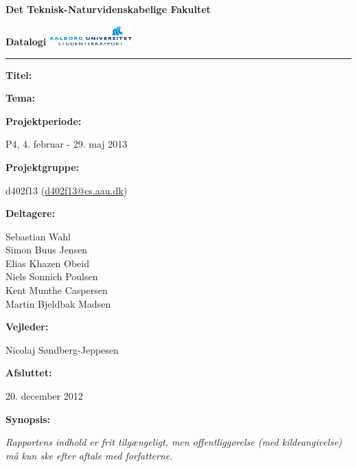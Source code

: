 \begin{nopagebreak}
\LARGE{\textbf{Det Teknisk-Naturvidenskabelige Fakultet}}\vspace{-0.9cm}

\large{\textbf{Datalogi}}
\hspace{10.5cm}\includegraphics[height=0.75cm]{billeder/aau_logo.pdf}


\hrule

\newcommand{\titleitem}[2]{\textbf{#1:}

\hspace*{0.5cm}
\begin{minipage}{0.9\columnwidth}#2\end{minipage}
\vspace{0.25cm}}
\begin{multicols}{2}

  \titleitem{Titel}{}

\titleitem{Tema}{}

\titleitem{Projektperiode}{P4, 4. februar - 29. maj 2013}

\titleitem{Projektgruppe}{d402f13 (\url{d402f13@cs.aau.dk})}

\titleitem{Deltagere}{
    Sebastian Wahl\\
    Simon Buus Jensen\\
    Elias Khazen Obeid\\
    Niels Sonnich Poulsen\\
    Kent Munthe Caspersen\\
    Martin Bjeldbak Madsen
}

\titleitem{Vejleder}{Nicolaj Søndberg-Jeppesen}

\titleitem{Afsluttet}{20. december 2012}

\vfill
\columnbreak

\titleitem{Synopsis}{  }

\end{multicols}
\centering
\textit{Rapportens indhold er frit tilgængeligt, men offentliggørelse (med kildeangivelse) må kun ske efter aftale med
forfatterne.}

\end{nopagebreak}

